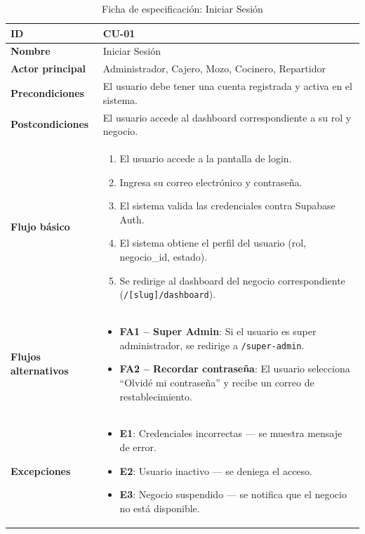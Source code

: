\documentclass[12pt, a4paper]{article}
\begin{document}
\begin{table}[H]
\centering
\caption{Ficha de especificación: Iniciar Sesión}
\begin{tabularx}{\textwidth}{|l|X|}
    \hline
    \textbf{ID} & CU-01 \\ \hline
    \textbf{Nombre} & Iniciar Sesión \\ \hline
    \textbf{Actor principal} & Administrador, Cajero, Mozo, Cocinero, Repartidor \\ \hline
    \textbf{Precondiciones} & El usuario debe tener una cuenta registrada y activa en el sistema. \\ \hline
    \textbf{Postcondiciones} & El usuario accede al dashboard correspondiente a su rol y negocio. \\ \hline
    \textbf{Flujo básico} &
    \begin{enumerate}[nosep, leftmargin=*]
        \item El usuario accede a la pantalla de login.
        \item Ingresa su correo electrónico y contraseña.
        \item El sistema valida las credenciales contra Supabase Auth.
        \item El sistema obtiene el perfil del usuario (rol, negocio\_id, estado).
        \item Se redirige al dashboard del negocio correspondiente (\texttt{/[slug]/dashboard}).
    \end{enumerate} \\ \hline
    \textbf{Flujos alternativos} &
    \begin{itemize}[nosep, leftmargin=*]
        \item \textbf{FA1 -- Super Admin}: Si el usuario es super administrador, se redirige a \texttt{/super-admin}.
        \item \textbf{FA2 -- Recordar contraseña}: El usuario selecciona ``Olvidé mi contraseña'' y recibe un correo de restablecimiento.
    \end{itemize} \\ \hline
    \textbf{Excepciones} &
    \begin{itemize}[nosep, leftmargin=*]
        \item \textbf{E1}: Credenciales incorrectas --- se muestra mensaje de error.
        \item \textbf{E2}: Usuario inactivo --- se deniega el acceso.
        \item \textbf{E3}: Negocio suspendido --- se notifica que el negocio no está disponible.
    \end{itemize} \\ \hline
\end{tabularx}
\end{table}
\end{document}
